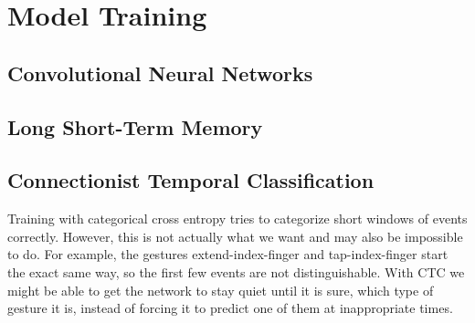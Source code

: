 \chapter{Model Training}
\label{chapter:training}

\section{Convolutional Neural Networks}

\section{Long Short-Term Memory}

\section{Connectionist Temporal Classification}

Training with categorical cross entropy tries to categorize short windows of events correctly.
However, this is not actually what we want and may also be impossible to do.
For example, the gestures extend-index-finger and tap-index-finger start the exact same way, so the first few events are not distinguishable.
With CTC we might be able to get the network to stay quiet until it is sure, which type of gesture it is, instead of forcing it to predict one of them at inappropriate times.
